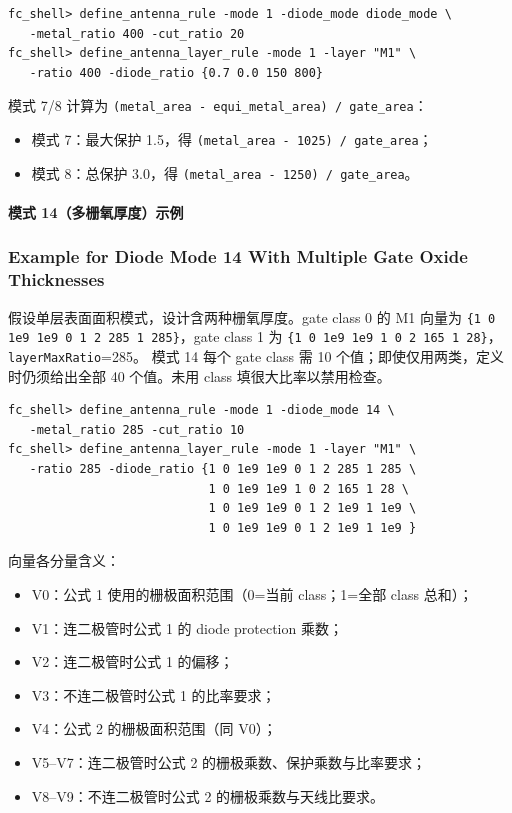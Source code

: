 \begin{lstlisting}
fc_shell> define_antenna_rule -mode 1 -diode_mode diode_mode \
   -metal_ratio 400 -cut_ratio 20
fc_shell> define_antenna_layer_rule -mode 1 -layer "M1" \
   -ratio 400 -diode_ratio {0.7 0.0 150 800}
\end{lstlisting}

模式 7/8 计算为 \texttt{(metal\_area - equi\_metal\_area) / gate\_area}：
\begin{itemize}
  \item 模式 7：最大保护 1.5，得 \texttt{(metal\_area - 1025) / gate\_area}；
  \item 模式 8：总保护 3.0，得 \texttt{(metal\_area - 1250) / gate\_area}。
\end{itemize}

\paragraph{模式 14（多栅氧厚度）示例}
\subsubsection*{Example for Diode Mode 14 With Multiple Gate Oxide Thicknesses}

假设单层表面面积模式，设计含两种栅氧厚度。gate class 0 的 M1 向量为
\texttt{\{1 0 1e9 1e9 0 1 2 285 1 285\}}，gate class 1 为
\texttt{\{1 0 1e9 1e9 1 0 2 165 1 28\}}，\texttt{layerMaxRatio}=285。
模式 14 每个 gate class 需 10 个值；即使仅用两类，定义时仍须给出全部 40 个值。未用 class 填很大比率以禁用检查。

\begin{lstlisting}
fc_shell> define_antenna_rule -mode 1 -diode_mode 14 \
   -metal_ratio 285 -cut_ratio 10
fc_shell> define_antenna_layer_rule -mode 1 -layer "M1" \
   -ratio 285 -diode_ratio {1 0 1e9 1e9 0 1 2 285 1 285 \
                            1 0 1e9 1e9 1 0 2 165 1 28 \
                            1 0 1e9 1e9 0 1 2 1e9 1 1e9 \
                            1 0 1e9 1e9 0 1 2 1e9 1 1e9 }
\end{lstlisting}

向量各分量含义：
\begin{itemize}
  \item V0：公式 1 使用的栅极面积范围（0=当前 class；1=全部 class 总和）；
  \item V1：连二极管时公式 1 的 diode protection 乘数；
  \item V2：连二极管时公式 1 的偏移；
  \item V3：不连二极管时公式 1 的比率要求；
  \item V4：公式 2 的栅极面积范围（同 V0）；
  \item V5--V7：连二极管时公式 2 的栅极乘数、保护乘数与比率要求；
  \item V8--V9：不连二极管时公式 2 的栅极乘数与天线比要求。
\end{itemize}

